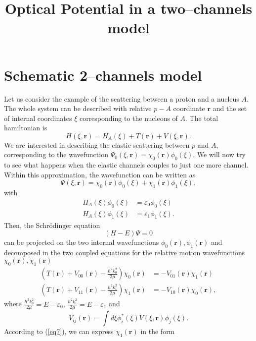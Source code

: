 \documentclass[a4paper,11pt]{article}
\title{Optical Potential in a two--channels model}
\begin{document}
\maketitle
\section{Schematic 2--channels model}
Let us  consider the example of the scattering between a proton and a nucleus $A$. The whole system can be described with relative $p-A$ coordinate $\mathbf{r}$ and the set of internal coordinates $\xi$ corresponding to the nucleons of $A$. The total hamiltonian is
\begin{equation}\label{eq1}
H(\xi,\mathbf{r})=H_{A}(\xi)+T(\mathbf{r})+V(\xi,\mathbf{r}).
\end{equation}
We are interested in describing  the elastic scattering between $p$ and $A$, corresponding to the wavefunction $\Psi_0(\xi,\mathbf{r})=\chi_0(\mathbf{r})\phi_0(\xi)$.
We will now try to see what happens when the elastic channels couples to just one more channel. Within this approximation, the wavefunction can be written as
\begin{equation}\label{eq2}
\Psi(\xi,\mathbf{r})=\chi_0(\mathbf{r})\phi_0(\xi)+\chi_1(\mathbf{r})\phi_1(\xi),
\end{equation}
with
\begin{eqnarray}\label{eq3}
\nonumber H_A(\xi)\phi_0(\xi)&=\varepsilon_0\phi_0(\xi)\\
H_A(\xi)\phi_1(\xi)&=\varepsilon_1\phi_1(\xi).
\end{eqnarray}
Then, the Schr\"{o}dinger equation
\begin{equation}\label{eq4}
(H-E)\Psi=0
\end{equation}
can be projected on the two internal wavefunctions $\phi_0(\mathbf{r}),\phi_1(\mathbf{r})$ and decomposed in the two coupled equations for the relative motion wavefunctions $\chi_0(\mathbf{r}),\chi_1(\mathbf{r})$
\begin{eqnarray}\label{eq5}
\nonumber \label{eq12}\left(T(\mathbf{r})+V_{00}(\mathbf{r})-\frac{\hbar^2k_0^2}{2 \mu}\right)\chi_0(\mathbf{r})&=-V_{01}(\mathbf{r})\chi_1(\mathbf{r})\\
\label{eq7} \left(T(\mathbf{r})+V_{11}(\mathbf{r})-\frac{\hbar^2k_1^2}{2 \mu}\right)\chi_1(\mathbf{r})&=-V_{10}(\mathbf{r})\chi_0(\mathbf{r}),
\end{eqnarray}
where $\tfrac{\hbar^2k_0^2}{2 \mu}=E-\varepsilon_0$, $\tfrac{\hbar^2k_1^2}{2 \mu}=E-\varepsilon_1$ and
\begin{equation}\label{eq6}
V_{ij}(\mathbf{r})=\int d\xi \phi^*_i(\xi)V(\xi,\mathbf{r})\phi_j(\xi).
\end{equation}
According to (\ref{eq7}), we can express $\chi_1(\mathbf{r})$ in the form
\end{document}
